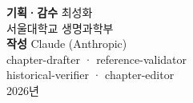 \documentclass[11pt]{article}
\newcommand{\gothic}{\sffamily}
\begin{document}
\vspace{5mm}
\hfill\begin{minipage}{62mm}\raggedleft
  {\gothic\small \textbf{기획·감수} 최성화}\\[0.4mm]
  {\gothic\footnotesize\color{muted} 서울대학교 생명과학부}\\[2.2mm]
  {\gothic\footnotesize\color{muted} \textbf{작성} Claude (Anthropic)}\\[0.4mm]
  {\gothic\scriptsize\color{muted} chapter-drafter · reference-validator}\\[0.2mm]
  {\gothic\scriptsize\color{muted} historical-verifier · chapter-editor}\\[2.2mm]
  {\gothic\footnotesize\color{celadondk} 2026년}
\end{minipage}
\end{document}
